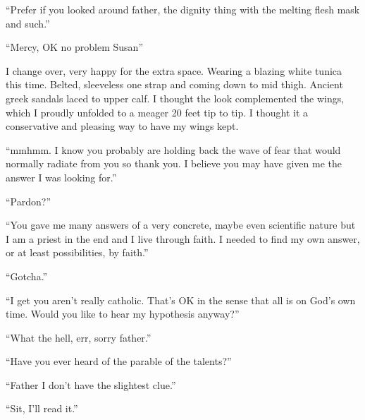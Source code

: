 ``Prefer if you looked around father, the dignity thing with the melting flesh mask and such.''

``Mercy, OK no problem Susan''

I change over, very happy for the extra space. Wearing a blazing white tunica this time. Belted, sleeveless one strap and coming down to mid thigh. Ancient greek sandals laced to upper calf. I thought the look complemented the wings, which I proudly unfolded to a meager 20 feet tip to tip. I thought it a conservative and pleasing way to have my wings kept.

``mmhmm. I know you probably are holding back the wave of fear that would normally radiate from you so thank you. I believe you may have given me the answer I was looking for.''

``Pardon?''

``You gave me many answers of a very concrete, maybe even scientific nature but I am a priest in the end and I live through faith. I needed to find my own answer, or at least possibilities, by faith.''

``Gotcha.''

``I get you aren't really catholic. That's OK in the sense that all is on God's own time. Would you like to hear my hypothesis anyway?''

``What the hell, err, sorry father.''

``Have you ever heard of the parable of the talents?''

``Father I don't have the slightest clue.''

``Sit, I'll read it.''
\medskip

